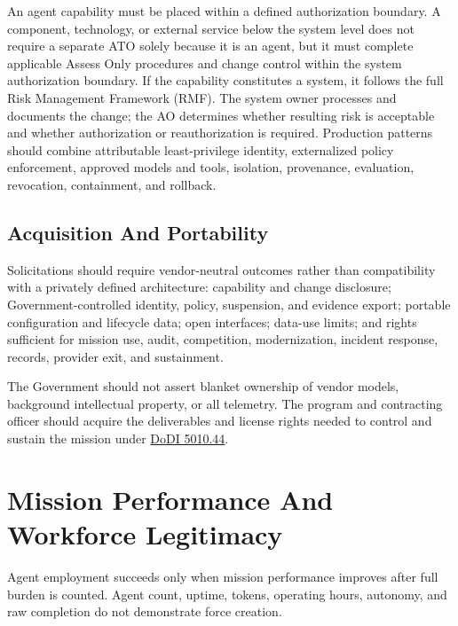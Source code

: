 \documentclass[11pt]{article}
\begin{document}
An agent capability must be placed within a defined authorization
boundary. A component, technology, or external service below the system
level does not require a separate ATO solely because it is an agent, but
it must complete applicable Assess Only procedures and change control
within the system authorization boundary. If the capability constitutes
a system, it follows the full Risk Management Framework (RMF). The
system owner processes and documents the change; the AO determines
whether resulting risk is acceptable and whether authorization or
reauthorization is required. Production patterns should combine
attributable least-privilege identity, externalized policy enforcement,
approved models and tools, isolation, provenance, evaluation,
revocation, containment, and rollback.

\hypertarget{83-acquisition-and-portability}{%
\subsection{Acquisition And
Portability}\label{83-acquisition-and-portability}}

Solicitations should require vendor-neutral outcomes rather than
compatibility with a privately defined architecture: capability and
change disclosure; Government-controlled identity, policy, suspension,
and evidence export; portable configuration and lifecycle data; open
interfaces; data-use limits; and rights sufficient for mission use,
audit, competition, modernization, incident response, records, provider
exit, and sustainment.

The Government should not assert blanket ownership of vendor models,
background intellectual property, or all telemetry. The program and
contracting officer should acquire the deliverables and license rights
needed to control and sustain the mission under
\href{https://www.esd.whs.mil/Portals/54/Documents/DD/issuances/dodi/501044p.pdf}{DoDI
5010.44}.

\hypertarget{9-mission-performance-and-workforce-legitimacy}{%
\section{Mission Performance And Workforce
Legitimacy}\label{9-mission-performance-and-workforce-legitimacy}}

Agent employment succeeds only when mission performance improves after
full burden is counted. Agent count, uptime, tokens, operating hours,
autonomy, and raw completion do not demonstrate force creation.
\end{document}
